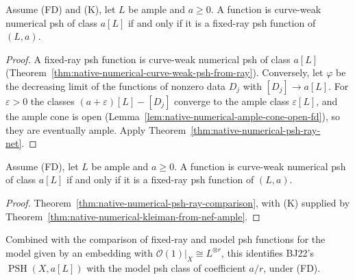 \begin{theorem}
\label{thm:native-numerical-psh-ray-comparison}
\leanok
{}
Assume (FD) and (K), let $L$ be ample and $a\ge0$.  A function is curve-weak
numerical psh of class $a[L]$ if and only if it is a fixed-ray psh function
of $(L,a)$.
\end{theorem}
\begin{proof}
A fixed-ray psh function is curve-weak numerical psh of class $a[L]$
(Theorem~\ref{thm:native-numerical-curve-weak-psh-from-ray}).  Conversely, let
$\varphi$ be the decreasing limit of the functions of nonzero data $D_j$
with $[D_j]\to a[L]$.  For $\varepsilon>0$ the classes
$(a+\varepsilon)[L]-[D_j]$ converge to the ample class $\varepsilon[L]$, and
the ample cone is open (Lemma~\ref{lem:native-numerical-ample-cone-open-fd}),
so they are eventually ample.  Apply
Theorem~\ref{thm:native-numerical-psh-ray-net}.
\end{proof}

\begin{corollary}
\label{cor:native-numerical-psh-ray-comparison-fd}
\leanok
{}
Assume (FD), let $L$ be ample and $a\ge0$.  A function is curve-weak numerical
psh of class $a[L]$ if and only if it is a fixed-ray psh function of $(L,a)$.
\end{corollary}
\begin{proof}
Theorem~\ref{thm:native-numerical-psh-ray-comparison}, with (K) supplied by
Theorem~\ref{thm:native-numerical-kleiman-from-nef-ample}.
\end{proof}

\begin{remark}
Combined with the comparison of fixed-ray and model psh functions for the
model given by an embedding with $\mathcal O(1)|_X\cong L^{\otimes r}$, this
identifies BJ22's $\operatorname{PSH}(X,a[L])$ with the model psh class of
coefficient $a/r$, under (FD).
\end{remark}
